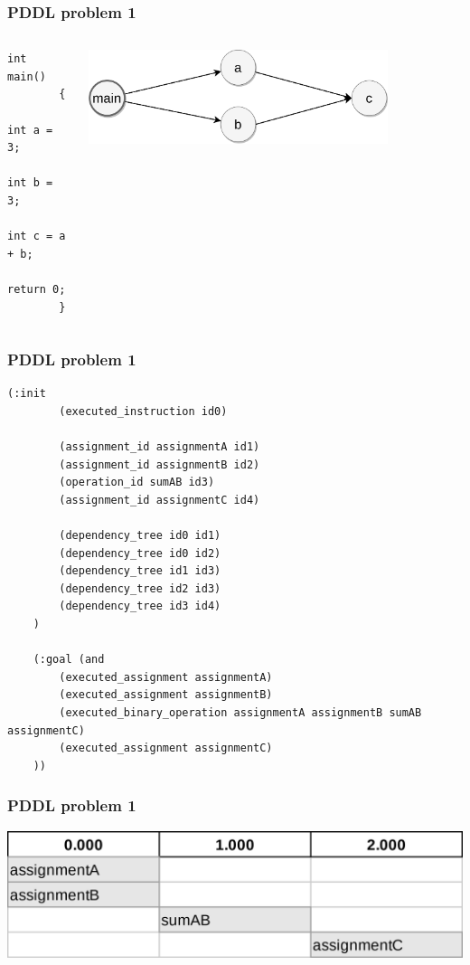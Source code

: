 \documentclass{beamer}
\begin{document}
\begin{frame}[fragile]
  \frametitle{PDDL problem 1}

  \begin{columns}
    \begin{column}{0.35\textwidth}
      \begin{lstlisting}[style=cppStyle]
        int main()
        {
          int a = 3;
          int b = 3;
          int c = a + b;
          return 0;
        }
      \end{lstlisting}
    \end{column}
    \begin{column}{0.65\textwidth}
      \begin{center}
        \includegraphics[width=0.8\textwidth]{../images/dependency-tree-Parallel.png}
      \end{center}
    \end{column}
  \end{columns}
\end{frame}

\begin{frame}[fragile]
  \frametitle{PDDL problem 1}

  \begin{lstlisting}[style=pddlStyle,basicstyle=\ttfamily\fontsize{10pt}{10pt}\selectfont]
    (:init
        (executed_instruction id0)

        (assignment_id assignmentA id1)
        (assignment_id assignmentB id2)
        (operation_id sumAB id3)
        (assignment_id assignmentC id4)
        
        (dependency_tree id0 id1)
        (dependency_tree id0 id2)
        (dependency_tree id1 id3)
        (dependency_tree id2 id3)
        (dependency_tree id3 id4)
    )

    (:goal (and
        (executed_assignment assignmentA)
        (executed_assignment assignmentB)
        (executed_binary_operation assignmentA assignmentB sumAB assignmentC)
        (executed_assignment assignmentC)
    ))
  \end{lstlisting}
\end{frame}

\begin{frame}[fragile]
  \frametitle{PDDL problem 1}

  \includegraphics[width=1\textwidth]{../images/parallel-tasks-Parallel.png}
\end{frame}
\end{document}
